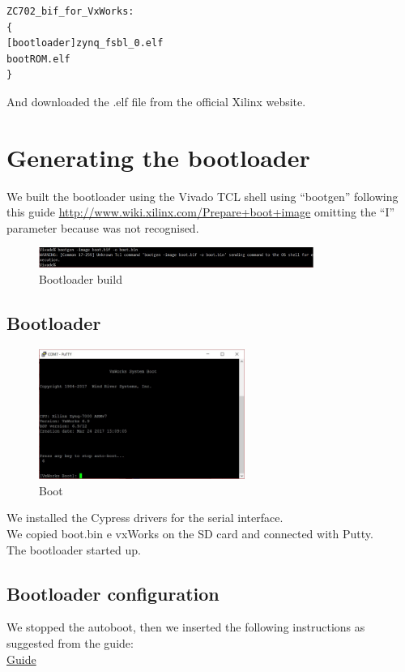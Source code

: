 \begin{lstlisting}[style=myCode]
ZC702_bif_for_VxWorks: 
{ 
[bootloader]zynq_fsbl_0.elf 
bootROM.elf 
}
\end{lstlisting} 
And downloaded the .elf file from the official Xilinx website.

\section{Generating the bootloader}
We built the bootloader using the Vivado TCL shell using “bootgen” following this guide \url{http://www.wiki.xilinx.com/Prepare+boot+image} omitting the “I” parameter  because was not recognised.\\

\begin{figure}[h]
	\centering		\includegraphics[width=0.8\textwidth]{img/bootloaderbuild}
	\caption{Bootloader build}
    	\label{fig:bootloaderbuild}
\end{figure}

\subsection{Bootloader}
\begin{figure}[h]
	\centering		\includegraphics[width=0.6\textwidth]{img/boot}
	\caption{Boot}
    	\label{fig:boot}
\end{figure}

We installed the Cypress drivers for the serial interface.\\
We copied boot.bin e vxWorks on the SD card and connected with Putty. \\
The bootloader started up.

\subsection{Bootloader configuration}
We stopped the autoboot, then we inserted the following instructions as suggested  from the guide:\\
\href{https://www.xilinx.com/support/documentation/application_notes/xapp1158-zynq-7000-vxworks-bsp.pdf}{Guide}

